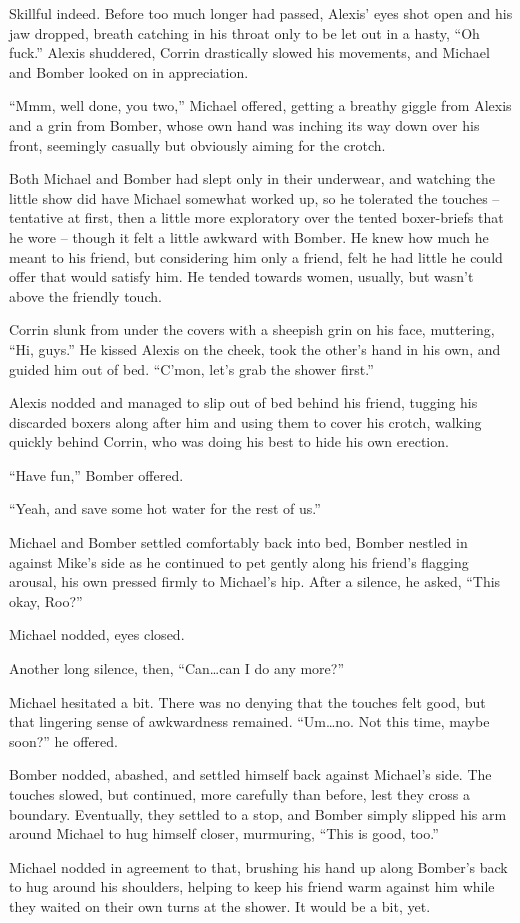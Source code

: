 Skillful indeed.  Before too much longer had passed, Alexis' eyes shot open and his jaw dropped, breath catching in his throat only to be let out in a hasty, ``Oh fuck.''  Alexis shuddered, Corrin drastically slowed his movements, and Michael and Bomber looked on in appreciation.

``Mmm, well done, you two,'' Michael offered, getting a breathy giggle from Alexis and a grin from Bomber, whose own hand was inching its way down over his front, seemingly casually but obviously aiming for the crotch.

Both Michael and Bomber had slept only in their underwear, and watching the little show did have Michael somewhat worked up, so he tolerated the touches -- tentative at first, then a little more exploratory over the tented boxer-briefs that he wore -- though it felt a little awkward with Bomber.  He knew how much he meant to his friend, but considering him only a friend, felt he had little he could offer that would satisfy him. He tended towards women, usually, but wasn't above the friendly touch.

Corrin slunk from under the covers with a sheepish grin on his face, muttering, ``Hi, guys.''  He kissed Alexis on the cheek, took the other's hand in his own, and guided him out of bed.  ``C'mon, let's grab the shower first.''

Alexis nodded and managed to slip out of bed behind his friend, tugging his discarded boxers along after him and using them to cover his crotch, walking quickly behind Corrin, who was doing his best to hide his own erection.

``Have fun,'' Bomber offered.

``Yeah, and save some hot water for the rest of us.''

Michael and Bomber settled comfortably back into bed, Bomber nestled in against Mike's side as he continued to pet gently along his friend's flagging arousal, his own pressed firmly to Michael's hip.  After a silence, he asked, ``This okay, Roo?''

Michael nodded, eyes closed.

Another long silence, then, ``Can\ldots{}can I do any more?''

Michael hesitated a bit.  There was no denying that the touches felt good, but that lingering sense of awkwardness remained.  ``Um\ldots{}no.  Not this time, maybe soon?'' he offered.

Bomber nodded, abashed, and settled himself back against Michael's side.  The touches slowed, but continued, more carefully than before, lest they cross a boundary.  Eventually, they settled to a stop, and Bomber simply slipped his arm around Michael to hug himself closer, murmuring, ``This is good, too.''

Michael nodded in agreement to that, brushing his hand up along Bomber's back to hug around his shoulders, helping to keep his friend warm against him while they waited on their own turns at the shower.  It would be a bit, yet.
